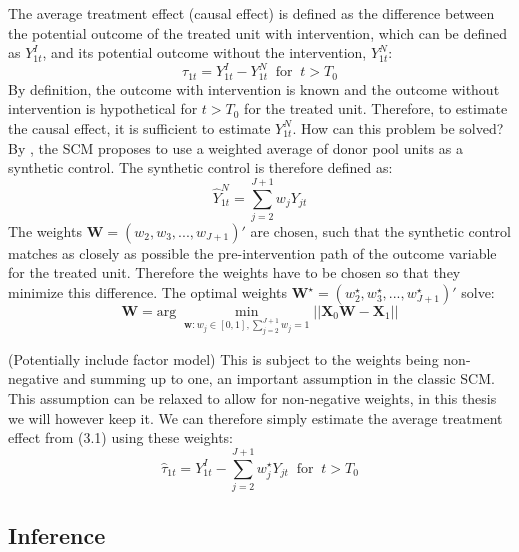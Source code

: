 \documentclass{scrbook}
\begin{document}
The average treatment effect (causal effect) is defined as the
difference between the potential outcome of the treated unit with
intervention, which can be defined as \(Y_{1t}^{I}\), and its potential
outcome without the intervention, \(Y_{1t}^{N}\): \begin{equation}
\tau_{1t}=Y_{1t}^{I}-Y_{1t}^{N}\; \; \text{for}\; \; t>T_{0}
\end{equation} By definition, the outcome with intervention is known and
the outcome without intervention is hypothetical for \(t>T_{0}\) for the
treated unit. Therefore, to estimate the causal effect, it is sufficient
to estimate \(Y_{1t}^{N}\). How can this problem be solved? By
\textcite{abadie_economic_2003}, the SCM proposes to use a weighted
average of donor pool units as a synthetic control. The synthetic
control is therefore defined as: \begin{equation}
\hat{Y}_{1t}^{N}=\sum_{j=2}^{J+1} w_{j}Y_{jt}
\end{equation} The weights \(\mathbf{W}=(w_{2},w_{3},...,w_{J+1})'\) are
chosen, such that the synthetic control matches as closely as possible
the pre-intervention path of the outcome variable for the treated unit.
Therefore the weights have to be chosen so that they minimize this
difference. The optimal weights
\(\mathbf{W}^{\star}=(w_{2}^{\star},w_{3}^{\star},...,w_{J+1}^{\star})'\)
solve: \begin{equation}
\mathbf{W}=\text{arg}\; \min_{\mathbf{w}:w_{j}\in[0,1],\sum_{j=2}^{J+1} w_{j}=1}\vert\vert\mathbf{X}_{0}\mathbf{W}-\mathbf{X}_{1}\vert\vert
\end{equation}

(Potentially include factor model) This is subject to the weights being
non-negative and summing up to one, an important assumption in the
classic SCM. This assumption can be relaxed to allow for non-negative
weights, in this thesis we will however keep it. We can therefore simply
estimate the average treatment effect from (3.1) using these weights:
\begin{equation}
\hat{\tau}_{1t}=Y_{1t}^{I}-\sum_{j=2}^{J+1} w_{j}^{\star}Y_{jt}\; \; \text{for}\; \; t>T_{0}
\end{equation}

\subsection*{Inference}
\end{document}
